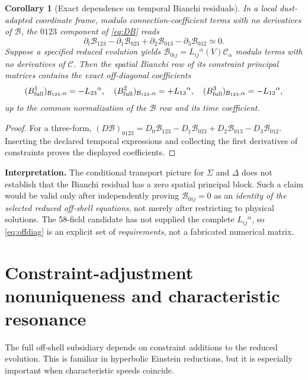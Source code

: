 \documentclass[11pt,a4paper]{article}
\newtheorem{corollary}[theorem]{Corollary}
\newcommand{\cC}{\mathcal C}
\newcommand{\cB}{\mathcal B}
\begin{document}
\begin{corollary}[Exact dependence on temporal Bianchi residuals]\label{cor:spatialB}
In a local dust-adapted coordinate frame, modulo connection-coefficient terms with no derivatives of $\cB$, the $0123$ component of \eqref{eq:DB} reads
\begin{equation}\label{eq:spatialB}
\boxed{\partial_t\cB_{123}
-\partial_1\cB_{023}+\partial_2\cB_{013}-\partial_3\cB_{012}
\simeq0.}
\end{equation}
Suppose a \emph{specified} reduced evolution yields $\cB_{0ij}=L_{ij}{}^{\alpha}(V)\cC_\alpha$ modulo terms with no derivatives of $\cC$. Then the spatial Bianchi row of its constraint principal matrices contains the exact off-diagonal coefficients
\begin{equation}\label{eq:offdiag}
(B^1_{\rm full})_{\cB_{123},\alpha}=-L_{23}{}^{\alpha},\quad
(B^2_{\rm full})_{\cB_{123},\alpha}=+L_{13}{}^{\alpha},\quad
(B^3_{\rm full})_{\cB_{123},\alpha}=-L_{12}{}^{\alpha},
\end{equation}
up to the common normalization of the $\cB$ row and its time coefficient.
\end{corollary}
\begin{proof}For a three-form, $(D\cB)_{0123}=D_0\cB_{123}-D_1\cB_{023}+D_2\cB_{013}-D_3\cB_{012}$. Inserting the declared temporal expressions and collecting the first derivatives of constraints proves the displayed coefficients.\end{proof}

\textbf{Interpretation.} The conditional transport picture for $\Sigma$ and $\Delta$ does not establish that the Bianchi residual has a zero spatial principal block. Such a claim would be valid only after independently proving $\cB_{0ij}=0$ as an \emph{identity of the selected reduced off-shell equations}, not merely after restricting to physical solutions. The 58-field candidate has not supplied the complete $L_{ij}{}^{\alpha}$, so \eqref{eq:offdiag} is an explicit set of \emph{requirements}, not a fabricated numerical matrix.

\section{Constraint-adjustment nonuniqueness and characteristic resonance}
The full off-shell subsidiary depends on constraint additions to the reduced evolution. This is familiar in hyperbolic Einstein reductions, but it is especially important when characteristic speeds coincide.
\end{document}
